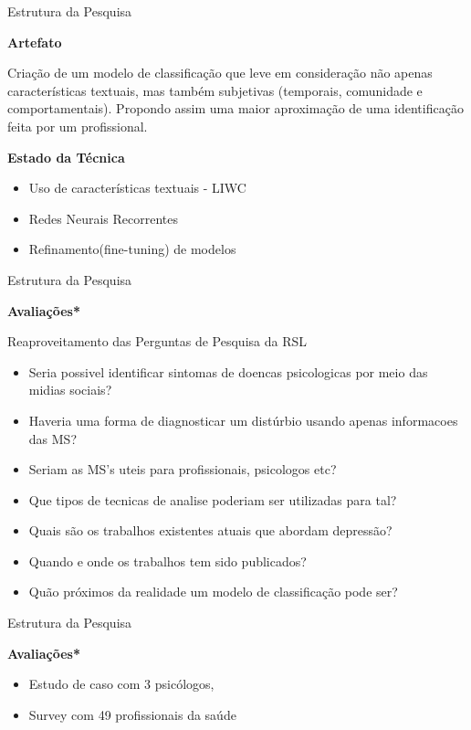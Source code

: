\documentclass[aspectratio=169,10pt,xcolor={dvipsnames}]{beamer}
\begin{document}
\begin{frame}{Estrutura da Pesquisa}{}

  \textbf{\large Artefato}
  \begin{block}{}
    Criação de um modelo de classificação que leve em consideração não apenas características textuais, mas também subjetivas (temporais, comunidade e comportamentais). Propondo assim uma maior aproximação de uma identificação feita por um profissional.
  \end{block}
  
  \textbf{\large Estado da Técnica}
  \begin{block}{}
      \begin{itemize}
        \item Uso de características textuais - LIWC
        \item Redes Neurais Recorrentes
        \item Refinamento(fine-tuning) de modelos
      \end{itemize}
  \end{block}
\end{frame}


\begin{frame}{Estrutura da Pesquisa}

  \textbf{\large Avaliações*}
  \begin{block}{Reaproveitamento das Perguntas de Pesquisa da RSL}
    \begin{itemize}
      \item Seria possivel identificar sintomas de doencas psicologicas por meio das midias sociais? 
      \item Haveria uma forma de diagnosticar um distúrbio usando apenas informacoes das MS? 	
      \item Seriam as MS's uteis para profissionais, psicologos etc? 	
      \item Que tipos de tecnicas de analise poderiam ser utilizadas para tal? 	
      \item Quais são os trabalhos existentes atuais que abordam depressão? 	
      \item Quando e onde os trabalhos tem sido publicados? 	
      \item Quão próximos da realidade um modelo de classificação pode ser? 
    \end{itemize}
  
  \end{block}
\end{frame}  


\begin{frame}{Estrutura da Pesquisa}

  \textbf{\large Avaliações*}
  \begin{block}{}
    \begin{itemize}
      \item Estudo de caso com 3 psicólogos,
      \item Survey com 49 profissionais da saúde
    \end{itemize}
  \end{block}
\end{frame}  
    
\end{document}

